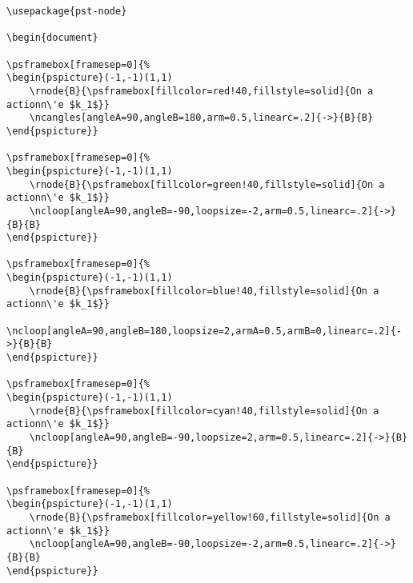 \documentclass[12pt]{article}
\begin{document}
\small
\begin{verbatim}
\usepackage{pst-node}

\begin{document}

\psframebox[framesep=0]{%
\begin{pspicture}(-1,-1)(1,1)
    \rnode{B}{\psframebox[fillcolor=red!40,fillstyle=solid]{On a actionn\'e $k_1$}}
    \ncangles[angleA=90,angleB=180,arm=0.5,linearc=.2]{->}{B}{B}
\end{pspicture}}

\psframebox[framesep=0]{%
\begin{pspicture}(-1,-1)(1,1)
    \rnode{B}{\psframebox[fillcolor=green!40,fillstyle=solid]{On a actionn\'e $k_1$}}
    \ncloop[angleA=90,angleB=-90,loopsize=-2,arm=0.5,linearc=.2]{->}{B}{B}
\end{pspicture}}

\psframebox[framesep=0]{%
\begin{pspicture}(-1,-1)(1,1)
    \rnode{B}{\psframebox[fillcolor=blue!40,fillstyle=solid]{On a actionn\'e $k_1$}}
    \ncloop[angleA=90,angleB=180,loopsize=2,armA=0.5,armB=0,linearc=.2]{->}{B}{B}
\end{pspicture}}

\psframebox[framesep=0]{%
\begin{pspicture}(-1,-1)(1,1)
    \rnode{B}{\psframebox[fillcolor=cyan!40,fillstyle=solid]{On a actionn\'e $k_1$}}
    \ncloop[angleA=90,angleB=-90,loopsize=2,arm=0.5,linearc=.2]{->}{B}{B}
\end{pspicture}}

\psframebox[framesep=0]{%
\begin{pspicture}(-1,-1)(1,1)
    \rnode{B}{\psframebox[fillcolor=yellow!60,fillstyle=solid]{On a actionn\'e $k_1$}}
    \ncloop[angleA=90,angleB=-90,loopsize=-2,arm=0.5,linearc=.2]{->}{B}{B}
\end{pspicture}}
\end{verbatim}
\end{document}
